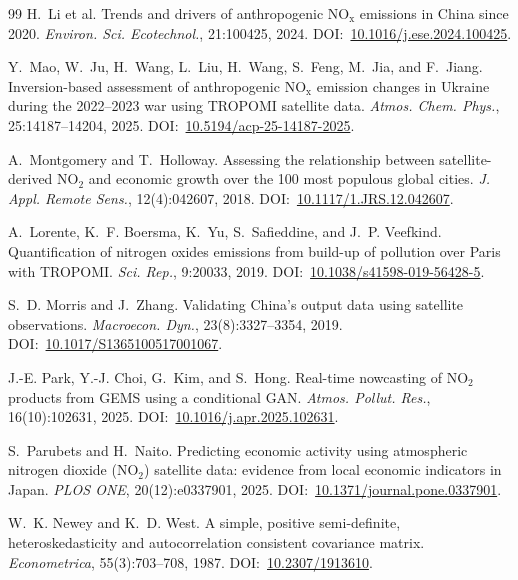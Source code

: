 \documentclass[11pt,a4paper]{article}
\providecommand{\doi}[1]{DOI:~\href{https://doi.org/#1}{#1}}
\providecommand{\ce}[1]{\ensuremath{\mathrm{#1}}}
\begin{document}
\begin{thebibliography}{99}
H.~Li et al.
\newblock Trends and drivers of anthropogenic \ce{NO_x} emissions in China since 2020.
\newblock \emph{Environ. Sci. Ecotechnol.}, 21:100425, 2024.
\newblock \doi{10.1016/j.ese.2024.100425}.

Y.~Mao, W.~Ju, H.~Wang, L.~Liu, H.~Wang, S.~Feng, M.~Jia, and F.~Jiang.
\newblock Inversion-based assessment of anthropogenic \ce{NO_x} emission changes in Ukraine during
the 2022--2023 war using TROPOMI satellite data.
\newblock \emph{Atmos. Chem. Phys.}, 25:14187--14204, 2025.
\newblock \doi{10.5194/acp-25-14187-2025}.

A.~Montgomery and T.~Holloway.
\newblock Assessing the relationship between satellite-derived \ce{NO_2} and economic growth over
the 100 most populous global cities.
\newblock \emph{J. Appl. Remote Sens.}, 12(4):042607, 2018.
\newblock \doi{10.1117/1.JRS.12.042607}.

A.~Lorente, K.~F. Boersma, K.~Yu, S.~Safieddine, and J.~P. Veefkind.
\newblock Quantification of nitrogen oxides emissions from build-up of pollution over Paris with
TROPOMI.
\newblock \emph{Sci. Rep.}, 9:20033, 2019.
\newblock \doi{10.1038/s41598-019-56428-5}.

S.~D. Morris and J.~Zhang.
\newblock Validating China's output data using satellite observations.
\newblock \emph{Macroecon. Dyn.}, 23(8):3327--3354, 2019.
\newblock \doi{10.1017/S1365100517001067}.

J.-E. Park, Y.-J. Choi, G.~Kim, and S.~Hong.
\newblock Real-time nowcasting of \ce{NO_2} products from GEMS using a conditional GAN.
\newblock \emph{Atmos. Pollut. Res.}, 16(10):102631, 2025.
\newblock \doi{10.1016/j.apr.2025.102631}.

S.~Parubets and H.~Naito.
\newblock Predicting economic activity using atmospheric nitrogen dioxide (\ce{NO_2}) satellite
data: evidence from local economic indicators in Japan.
\newblock \emph{PLOS ONE}, 20(12):e0337901, 2025.
\newblock \doi{10.1371/journal.pone.0337901}.

W.~K. Newey and K.~D. West.
\newblock A simple, positive semi-definite, heteroskedasticity and autocorrelation consistent
covariance matrix.
\newblock \emph{Econometrica}, 55(3):703--708, 1987.
\newblock \doi{10.2307/1913610}.


\end{thebibliography}
\end{document}
